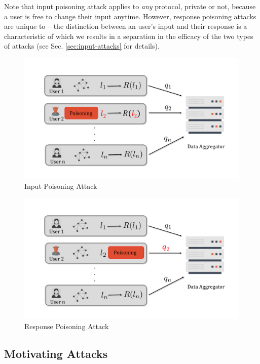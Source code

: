 Note that input poisoning attack applies to \textit{any} protocol, private or not, because a user is free to change their input anytime. However, response poisoning attacks are unique to \ldp{} -- the distinction between an user's input and their response is a characteristic of \ldp{} which we results in a separation in the efficacy of the two types of attacks (see Sec. \ref{sec:input-attacks} for details). 


\begin{figure}
    \vspace{-0.5cm}
    \centering
    \includegraphics[width=0.8\columnwidth]{graph_pic_3.pdf}
    \vspace{-0.5cm}
    \caption{Input Poisoning Attack}
    \label{fig:input} 
        \vspace{-0.6cm}
\end{figure}
\begin{figure}[bt]
    \centering
 \includegraphics[width=0.8\columnwidth]{graph_pic_2.pdf}
     \vspace{-0.5cm}
   \caption{Response Poisoning Attack}
    \label{fig:response} \vspace{-0.5cm}
\end{figure}





  \vspace{-0.2cm}  \subsection{Motivating Attacks}\label{sec:attacks}

